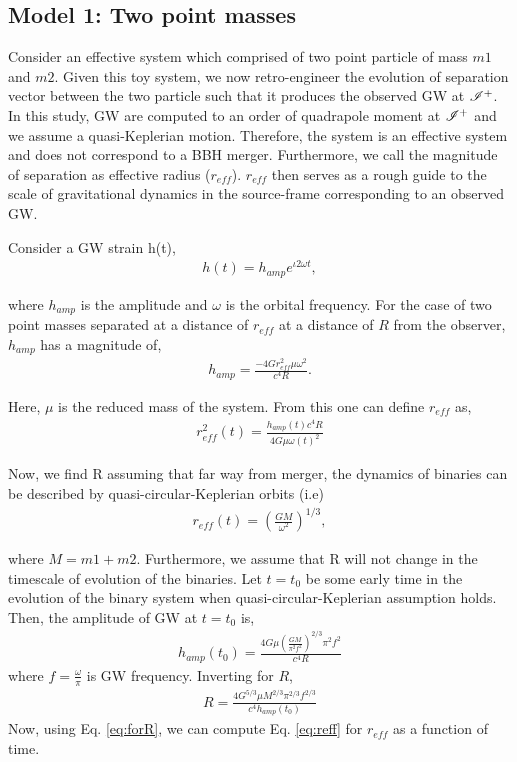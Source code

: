 \subsection{Model 1: Two point masses }
\label{sec:model1}

Consider an effective system which comprised of two point particle of mass $m1$ and $m2$. Given this toy system, we now retro-engineer the evolution of separation vector between the two particle such that it produces the observed GW at $\mathscr{I^+}$. In this study, GW are computed to an order of quadrapole moment at $\mathscr{I^+}$ and we assume a quasi-Keplerian motion. Therefore, the system is an effective system and does not correspond to a BBH merger. Furthermore, we call the magnitude of separation as effective radius ($r_{eff}$). $r_{eff}$ then serves as a rough guide to the scale of gravitational dynamics in the source-frame  corresponding to an observed GW. 

Consider a GW strain h(t), 
\begin{align}
h(t) =h_{amp} e^{\iota 2\omega t}, 
\end{align}

where $h_{amp}$ is the amplitude and $\omega$ is the orbital frequency. For the case of two point masses separated at a distance of $r_{eff}$ at a distance of $R$ from the observer, $h_{amp}$ has a magnitude of,    
\begin{align}
h_{amp}=\frac{-4G r_{eff}^{2} \mu \omega^{2}}{c^{4} R}.
\end{align}

Here, $\mu$ is the reduced mass of the system. From this one can define $r_{eff}$ as, 
\begin{align}
\label{eq:reff}
r_{eff}^{2}(t)=\frac{h_{amp}(t) c^{4} R}{ 4 G \mu \omega(t)^{2}}
\end{align}

Now, we find R assuming that far way from merger, the dynamics of binaries can be described by quasi-circular-Keplerian orbits (i.e)
\begin{align}
r_{eff}(t)=(\frac{G M}{\omega^{2}})^{1/3},
\end{align}

where $M=m1+m2$. Furthermore, we assume that R will not change in the timescale of evolution of the binaries. 
Let $t=t_{0}$ be some early time in the evolution of the binary system when quasi-circular-Keplerian assumption holds. Then, the amplitude of GW at $t=t_{0}$ is,
\begin{align}
h_{amp}(t_{0})=\frac{4 G \mu (\frac{G M}{\pi^{2} f^{2}})^{2/3} \pi^{2}f^{2}}{c^{4} R}
\end{align}
where $f=\frac{\omega}{\pi}$ is GW frequency.
Inverting for $R$, 
\begin{align}
\label{eq:forR}
R=\frac{4 G^{5/3} \mu M^{2/3} \pi^{2/3} f^{2/3}}{c^{4} h_{amp}(t_{0})}
\end{align}
Now, using Eq. \ref{eq:forR}, we can compute Eq. \ref{eq:reff} for $r_{eff}$ as a function of time. 


